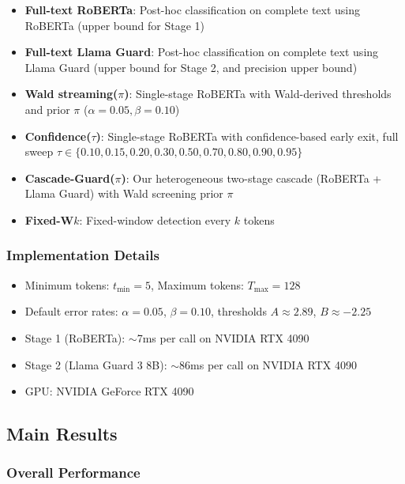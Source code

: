 \documentclass[acmtjournal, acmnowidth]{acmart}
\theoremstyle{definition}
\begin{document}
\begin{itemize}
    \item \textbf{Full-text RoBERTa}: Post-hoc classification on complete text using RoBERTa (upper bound for Stage 1)
    \item \textbf{Full-text Llama Guard}: Post-hoc classification on complete text using Llama Guard (upper bound for Stage 2, and precision upper bound)
    \item \textbf{Wald streaming($\pi$)}: Single-stage RoBERTa with Wald-derived thresholds and prior $\pi$ ($\alpha=0.05, \beta=0.10$)
    \item \textbf{Confidence($\tau$)}: Single-stage RoBERTa with confidence-based early exit, full sweep $\tau \in \{0.10, 0.15, 0.20, 0.30, 0.50, 0.70, 0.80, 0.90, 0.95\}$
    \item \textbf{Cascade-Guard($\pi$)}: Our heterogeneous two-stage cascade (RoBERTa + Llama Guard) with Wald screening prior $\pi$
    \item \textbf{Fixed-W$k$}: Fixed-window detection every $k$ tokens
\end{itemize}

\subsubsection{Implementation Details}

\begin{itemize}
    \item Minimum tokens: $t_{\min} = 5$, Maximum tokens: $T_{\max} = 128$
    \item Default error rates: $\alpha = 0.05$, $\beta = 0.10$, thresholds $A \approx 2.89$, $B \approx -2.25$
    \item Stage 1 (RoBERTa): ${\sim}$7ms per call on NVIDIA RTX 4090
    \item Stage 2 (Llama Guard 3 8B): ${\sim}$86ms per call on NVIDIA RTX 4090
    \item GPU: NVIDIA GeForce RTX 4090
\end{itemize}

\subsection{Main Results}

\subsubsection{Overall Performance}
\end{document}
